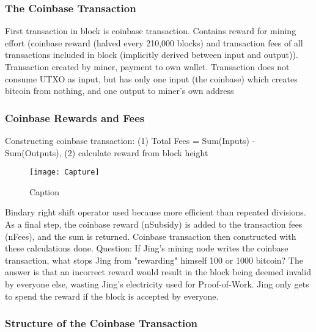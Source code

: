 \documentclass[english, 11pt]{article}
\begin{document}
\subsubsection{The Coinbase Transaction}
\noindent First transaction in block is coinbase transaction. Contains reward for mining effort (coinbase reward (halved every 210,000 blocks) and transaction fees of all transactions included in block (implicitly derived between input and output)). Transaction created by miner, payment to own wallet. Transaction does not consume UTXO as input, but has only one input (the coinbase) which creates bitcoin from nothing, and one output to miner's own address

\subsubsection{Coinbase Rewards and Fees}

\noindent Constructing coinbase transaction: (1) Total Fees = Sum(Inputs) - Sum(Outputs), (2) calculate reward from block height

\begin{figure}[H]
    \texttt{[image: Capture]}
    \caption{Caption}
    \label{fig:my_label}
\end{figure}

\noindent Bindary right shift operator used because more efficient than repeated divisions. As a final step, the coinbase reward (nSubsidy) is added to the transaction fees (nFees), and the sum is returned. Coinbase transaction then constructed with these calculations done.
\noindent Question: If Jing’s mining node writes the coinbase transaction, what stops Jing from "rewarding" himself 100 or 1000 bitcoin? The answer is that an incorrect reward would result in the block being deemed invalid by everyone else, wasting Jing’s electricity used for Proof-of-Work. Jing only gets to spend the reward if the block is accepted by everyone.

\subsubsection{Structure of the Coinbase Transaction}
\end{document}
